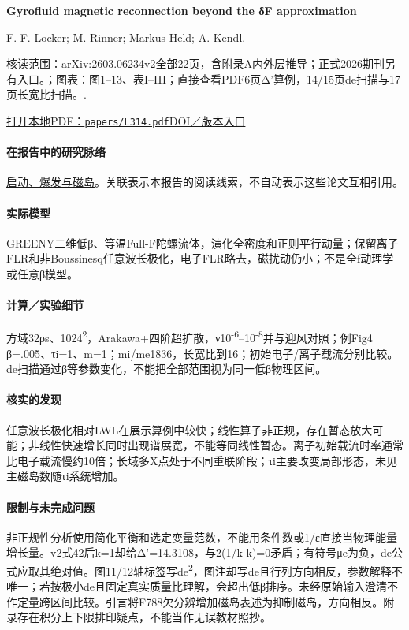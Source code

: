 \documentclass[UTF8,a4paper,11pt,openany,fontset=fandol]{ctexbook}
\begin{document}
\textbf{Gyrofluid magnetic reconnection beyond the δF approximation}\citep{L314}\

F. F. Locker;  M. Rinner;  Markus Held;  A. Kendl.

\textsf{核读范围：}arXiv:2603.06234v2全部22页，含附录A内外层推导；正式2026期刊另有入口。；\textsf{图表：}图1–13、表I–III；直接查看PDF6页Δ'算例，14/15页de扫描与17页长宽比扫描。.

\href{run:../papers/L314.pdf}{打开本地PDF：\texttt{papers/L314.pdf}}\quad\href{https://doi.org/10.1063/5.0332416}{DOI／版本入口}

\paragraph{在报告中的研究脉络}\hyperref[story:onset]{启动、爆发与磁岛}。关联表示本报告的阅读线索，不自动表示这些论文互相引用。

\paragraph{实际模型}GREENY二维低β、等温Full-F陀螺流体，演化全密度和正则平行动量；保留离子FLR和非Boussinesq任意波长极化，电子FLR略去，磁扰动仍小；不是全f动理学或任意β模型。

\paragraph{计算／实验细节}方域32ρs、1024\textsuperscript{2}，Arakawa+四阶超扩散，ν10\textsuperscript{-6}–10\textsuperscript{-8}并与迎风对照；例Fig4 β=.005、τi=1、m=1；mi/me1836，长宽比到16；初始电子/离子载流分别比较。de扫描通过β等参数变化，不能把全部范围视为同一低β物理区间。

\paragraph{核实的发现}任意波长极化相对LWL在展示算例中较快；线性算子非正规，存在暂态放大可能；非线性快速增长同时出现谱展宽，不能等同线性暂态。离子初始载流时率通常比电子载流慢约10倍；长域多X点处于不同重联阶段；τi主要改变局部形态，未见主磁岛数随τi系统增加。

\paragraph{限制与未完成问题}非正规性分析使用简化平衡和选定变量范数，不能用条件数或1/ε直接当物理能量增长量。v2式42后k=1却给Δ'=14.3108，与2(1/k-k)=0矛盾；有符号μe为负，de公式应取其绝对值。图11/12轴标签写de\textsuperscript{2}，图注却写de且行列方向相反，参数解释不唯一；若按极小de且固定真实质量比理解，会超出低β排序。未经原始输入澄清不作定量跨区间比较。引言将F788欠分辨增加磁岛表述为抑制磁岛，方向相反。附录存在积分上下限排印疑点，不能当作无误教材照抄。
\end{document}

